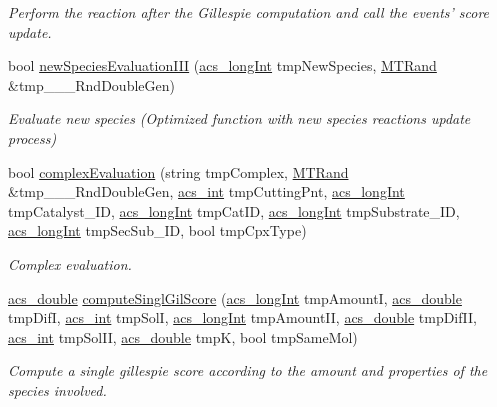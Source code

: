 \begin{DoxyCompactItemize}
\begin{DoxyCompactList}\small\item\em Perform the reaction after the Gillespie computation and call the events' score update. \end{DoxyCompactList}\item 
bool \hyperlink{a00003_a4fe7891fb38f3f25bb82769af0ddfe19}{new\-Species\-Evaluation\-I\-I\-I} (\hyperlink{a00016_a19319d75f02db4308bc5c0026d98cd85}{acs\-\_\-long\-Int} tmp\-New\-Species, \hyperlink{a00008}{M\-T\-Rand} \&tmp\-\_\-\-\_\-\-\_\-\-Rnd\-Double\-Gen)
\begin{DoxyCompactList}\small\item\em Evaluate new species (Optimized function with new species reactions update process) \end{DoxyCompactList}\item 
bool \hyperlink{a00003_a5ee6b203f077de1467aa72042814db7d}{complex\-Evaluation} (string tmp\-Complex, \hyperlink{a00008}{M\-T\-Rand} \&tmp\-\_\-\-\_\-\-\_\-\-Rnd\-Double\-Gen, \hyperlink{a00016_a8d277355641a098190360234e2ebde35}{acs\-\_\-int} tmp\-Cutting\-Pnt, \hyperlink{a00016_a19319d75f02db4308bc5c0026d98cd85}{acs\-\_\-long\-Int} tmp\-Catalyst\-\_\-\-I\-D, \hyperlink{a00016_a19319d75f02db4308bc5c0026d98cd85}{acs\-\_\-long\-Int} tmp\-Cat\-I\-D, \hyperlink{a00016_a19319d75f02db4308bc5c0026d98cd85}{acs\-\_\-long\-Int} tmp\-Substrate\-\_\-\-I\-D, \hyperlink{a00016_a19319d75f02db4308bc5c0026d98cd85}{acs\-\_\-long\-Int} tmp\-Sec\-Sub\-\_\-\-I\-D, bool tmp\-Cpx\-Type)
\begin{DoxyCompactList}\small\item\em Complex evaluation. \end{DoxyCompactList}\item 
\hyperlink{a00016_ab776853a005fcbf56af0424a2a4dd607}{acs\-\_\-double} \hyperlink{a00003_ae1270b9c235dd6b28413075197dba8e0}{compute\-Singl\-Gil\-Score} (\hyperlink{a00016_a19319d75f02db4308bc5c0026d98cd85}{acs\-\_\-long\-Int} tmp\-Amount\-I, \hyperlink{a00016_ab776853a005fcbf56af0424a2a4dd607}{acs\-\_\-double} tmp\-Dif\-I, \hyperlink{a00016_a8d277355641a098190360234e2ebde35}{acs\-\_\-int} tmp\-Sol\-I, \hyperlink{a00016_a19319d75f02db4308bc5c0026d98cd85}{acs\-\_\-long\-Int} tmp\-Amount\-I\-I, \hyperlink{a00016_ab776853a005fcbf56af0424a2a4dd607}{acs\-\_\-double} tmp\-Dif\-I\-I, \hyperlink{a00016_a8d277355641a098190360234e2ebde35}{acs\-\_\-int} tmp\-Sol\-I\-I, \hyperlink{a00016_ab776853a005fcbf56af0424a2a4dd607}{acs\-\_\-double} tmp\-K, bool tmp\-Same\-Mol)
\begin{DoxyCompactList}\small\item\em Compute a single gillespie score according to the amount and properties of the species involved. \end{DoxyCompactList}\item 

\end{DoxyCompactItemize}

